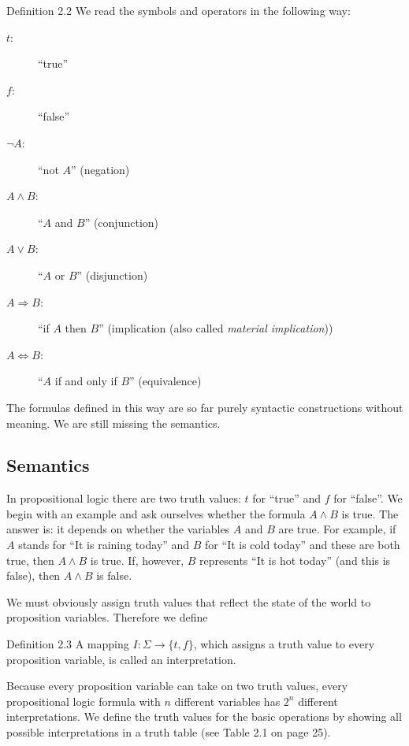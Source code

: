 \documentclass[10pt]{book}
\begin{document}
Definition 2.2 We read the symbols and operators in the following way:
\begin{description}
  \item[$t$:] ``true''
  \item[$f$:] ``false''
  \item[$\neg A$:] ``not $A$'' (negation)
  \item[$A \wedge B$:] ``$A$ and $B$'' (conjunction)
  \item[$A \vee B$:] ``$A$ or $B$'' (disjunction)
  \item[$A \Rightarrow B$:] ``if $A$ then $B$'' (implication (also called \emph{material implication}))
  \item[$A \Leftrightarrow B$:] ``$A$ if and only if $B$'' (equivalence)
\end{description}

The formulas defined in this way are so far purely syntactic constructions without meaning. We are still missing the semantics.

\subsection{Semantics}
In propositional logic there are two truth values: $t$ for ``true'' and $f$ for ``false''. We begin with an example and ask ourselves whether the formula $A \wedge B$ is true. The answer is: it depends on whether the variables $A$ and $B$ are true. For example, if $A$ stands for ``It is raining today'' and $B$ for ``It is cold today'' and these are both true, then $A \wedge B$ is true. If, however, $B$ represents ``It is hot today'' (and this is false), then $A \wedge B$ is false.

We must obviously assign truth values that reflect the state of the world to proposition variables. Therefore we define
\begin{displayquote}
Definition 2.3 A mapping $I: \Sigma \rightarrow\{t, f\}$, which assigns a truth value to every proposition variable, is called an interpretation.
\end{displayquote}

Because every proposition variable can take on two truth values, every propositional logic formula with $n$ different variables has $2^{n}$ different interpretations. We define the truth values for the basic operations by showing all possible interpretations in a truth table (see Table 2.1 on page 25).
\end{document}
